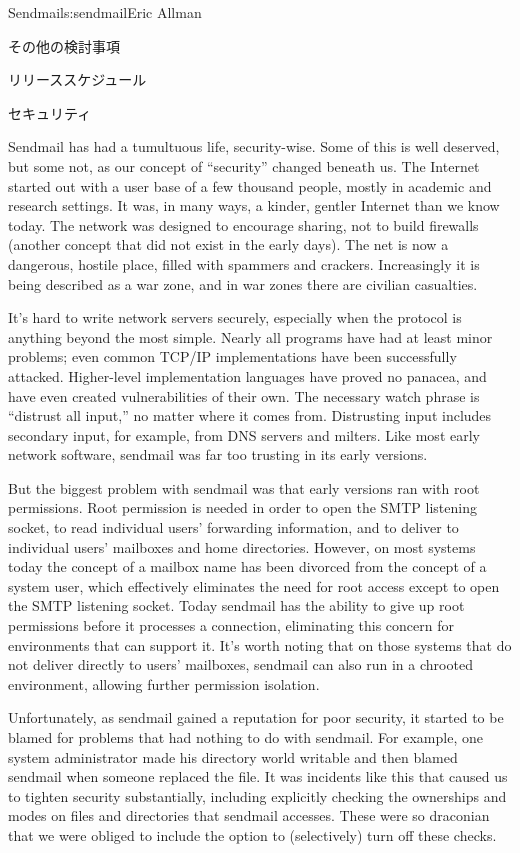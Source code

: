 \begin{aosachapter}{Sendmail}{s:sendmail}{Eric Allman}
\begin{aosasect1}{その他の検討事項}
\begin{aosasect2}{リリーススケジュール}
\end{aosasect2}

\end{aosasect1}

\begin{aosasect1}{セキュリティ}

Sendmail has had a tumultuous life, security-wise. Some of this is
well deserved, but some not, as our concept of ``security'' changed
beneath us. The Internet started out with a user base of a few
thousand people, mostly in academic and research settings. It was, in
many ways, a kinder, gentler Internet than we know today. The network
was designed to encourage sharing, not to build firewalls (another
concept that did not exist in the early days). The net is now a
dangerous, hostile place, filled with spammers and crackers.
Increasingly it is being described as a war zone, and in war zones
there are civilian casualties.

It's hard to write network servers securely, especially when the
protocol is anything beyond the most simple. Nearly all programs have
had at least minor problems; even common TCP/IP implementations have
been successfully attacked. Higher-level implementation languages have
proved no panacea, and have even created vulnerabilities of their
own. The necessary watch phrase is ``distrust all input,'' no matter
where it comes from. Distrusting input includes secondary input, for
example, from DNS servers and milters. Like most early network
software, sendmail was far too trusting in its early versions.

But the biggest problem with sendmail was that early versions ran with
root permissions. Root permission is needed in order to open the SMTP
listening socket, to read individual users' forwarding information,
and to deliver to individual users' mailboxes and home
directories. However, on most systems today the concept of a mailbox
name has been divorced from the concept of a system user, which
effectively eliminates the need for root access except to open the
SMTP listening socket. Today sendmail has the ability to give up root
permissions before it processes a connection, eliminating this concern
for environments that can support it. It's worth noting that on those
systems that do not deliver directly to users' mailboxes, sendmail can
also run in a chrooted environment, allowing further permission
isolation.

Unfortunately, as sendmail gained a reputation for poor security, it
started to be blamed for problems that had nothing to do with
sendmail.  For example, one system administrator made his 
directory world writable and then blamed sendmail when someone
replaced the  file. It was incidents like this that
caused us to tighten security substantially, including explicitly
checking the ownerships and modes on files and directories that
sendmail accesses. These were so draconian that we were obliged to
include the  option to (selectively) turn off
these checks.


\end{aosasect1}
\end{aosachapter}
